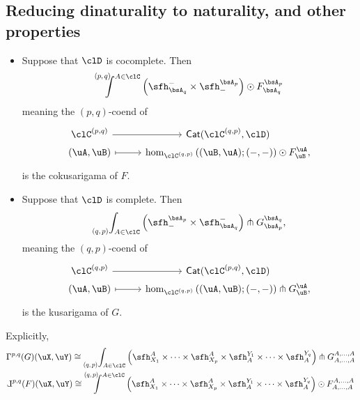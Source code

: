 \documentclass[11pt]{amsart}
\begin{document}
\subsection{Reducing dinaturality to naturality, and other properties}
\begin{construction}\leavevmode\label{con:constructing-cokusarigamas}%
	\begin{itemize} \item Suppose that $\clD$ is cocomplete. Then
	\[
		\pqCoend{p}{q}{A\in\clC}\left(\ph^{-}_{\bsA_{q}}\times\ph^{\bsA_{p}}_{-}\right)\odot F^{\bsA_{p}}_{\bsA_{q}}
	\]%
	meaning the $(p,q)$-coend of
	\[
		\begin{tikzcd}[row sep=0.0em, column sep=2.7em, ampersand replacement=\&]
			\pq{\clC}
			\arrow[r]
			\&
			\Cat(\pq{\clC}[q][p],\clD)
			\\
			(\uA,\uB)
			\arrow[r, mapsto]
			\&
			\hom_{\pq{\clC}[q][p]}\left((\uB,\uA);(-,-)\right)\odot F^{\uA}_{\uB},
		\end{tikzcd}
	\]
	is the cokusarigama of $F$.
	\item Suppose that $\clD$ is complete. Then
	\[
		\pqEnd{q}{p}{A\in\clC}\left(\ph^{\bsA_{p}}_{-}\times\ph^{-}_{\bsA_{q}}\right)\pitchfork G^{\bsA_{q}}_{\bsA_{p}},
	\]%
	meaning the $(q,p)$-coend of
	\[%
		\begin{tikzcd}[row sep=0.0em, column sep=2.7em, ampersand replacement=\&]
			\pq{\clC}[q][p]
			\arrow[r]
			\&
			\Cat(\pq{\clC},\clD)
			\\
			(\uA,\uB)
			\arrow[r, mapsto]
			\&
			\hom_{\pq{\clC}[q][p]}\left((\uA,\uB);(-,-)\right)\pitchfork G^{\uA}_{\uB},
		\end{tikzcd}
	\]%
	is the kusarigama of $G$.
\end{itemize}
\end{construction}
Explicitly, 
\begin{gather*}
\kgfpq{p}{q}(G)(\uX,\uY)  \cong \pqEnd{q}{p}{A\in\clC} \Big(\ph^{A}_{X_1} \times \dots \times\ph^{A}_{X_p} \times \ph^{Y_1}_{A} \times \dots \times\ph^{Y_q}_A \Big)\pitchfork G^{A,\dots,A}_{A,\dots,A}\\
\ckgfpq{p}{q}(F)(\uX,\uY)  \cong \pqCoend{q}{p}{A\in\clC} \Big(\ph^{A}_{X_1} \times \dots \times \ph^{A}_{X_p} \times \ph^{Y_1}_{A} \times \dots \times\ph^{Y_q}_A \Big)\odot F^{A,\dots,A}_{A,\dots,A}\\
\end{gather*}
\end{document}
